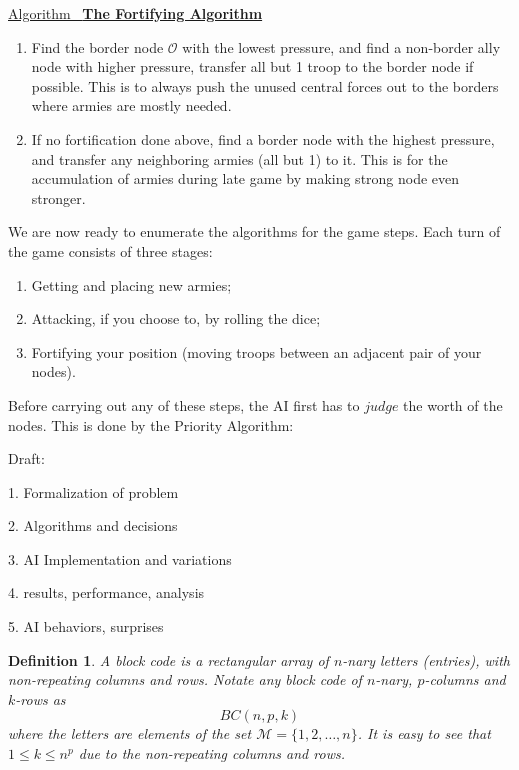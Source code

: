 \documentclass[12pt]{article}  %
\newtheorem{definition}{Definition}
\newcommand{\algtitle}[1]{\underline{Algorithm \ {\bf #1}} \vspace*{1mm}\\}
\begin{document}
\algtitle{The Fortifying Algorithm}

\begin{enumerate}
	\item Find the border node $\mathcal{O}$ with the lowest pressure, and find a non-border ally node with higher pressure, transfer all but 1 troop to the border node if possible. This is to always push the unused central forces out to the borders where armies are mostly needed.
	\item If no fortification done above, find a border node with the highest pressure, and transfer any neighboring armies (all but 1) to it. This is for the accumulation of armies during late game by making strong node even stronger.
\end{enumerate}












We are now ready to enumerate the algorithms for the game steps. Each turn of the game consists of three stages:

\begin{enumerate}
\item Getting and placing new armies;
\item Attacking, if you choose to, by rolling the dice; 
\item Fortifying your position (moving troops between an adjacent pair of your nodes).
\end{enumerate}

Before carrying out any of these steps, the AI first has to $\textit{judge}$ the worth of the nodes. This is done by the Priority Algorithm:










Draft:

1. Formalization of problem

2. Algorithms and decisions

3. AI Implementation and variations

4. results, performance, analysis

5. AI behaviors, surprises



\begin{definition}
A block code is a rectangular array of $n$-nary letters (entries), with non-repeating columns and rows. Notate any block code of $n$-nary, $p$-columns and $k$-rows as 
$$BC(n,p,k)$$
where the letters are elements of the set $\mathcal{M}=\{1,2,\dots,n\}$. 
It is easy to see that $1\leq k \leq n^p$ due to the non-repeating columns and rows.
\end{definition}
\end{document}
